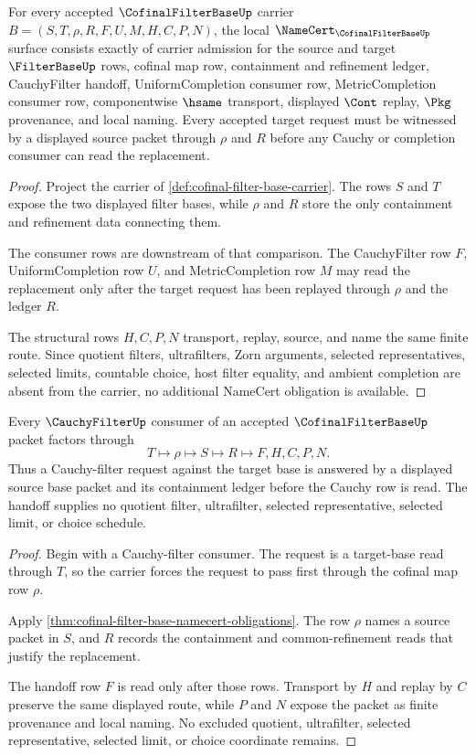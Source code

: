 \begin{theorem}
\label{thm:cofinal-filter-base-namecert-obligations}
For every accepted $\CofinalFilterBaseUp$ carrier $B=(S,T,\rho,R,F,U,M,H,C,P,N)$, the local $\NameCert_{\CofinalFilterBaseUp}$ surface consists exactly of carrier admission for the source and target $\FilterBaseUp$ rows, cofinal map row, containment and refinement ledger, CauchyFilter handoff, UniformCompletion consumer row, MetricCompletion consumer row, componentwise $\hsame$ transport, displayed $\Cont$ replay, $\Pkg$ provenance, and local naming. Every accepted target request must be witnessed by a displayed source packet through $\rho$ and $R$ before any Cauchy or completion consumer can read the replacement.
\end{theorem}
\begin{proof}
Project the carrier of \autoref{def:cofinal-filter-base-carrier}. The rows $S$ and $T$ expose the two displayed filter bases, while $\rho$ and $R$ store the only containment and refinement data connecting them.

The consumer rows are downstream of that comparison. The CauchyFilter row $F$, UniformCompletion row $U$, and MetricCompletion row $M$ may read the replacement only after the target request has been replayed through $\rho$ and the ledger $R$.

The structural rows $H,C,P,N$ transport, replay, source, and name the same finite route. Since quotient filters, ultrafilters, Zorn arguments, selected representatives, selected limits, countable choice, host filter equality, and ambient completion are absent from the carrier, no additional NameCert obligation is available.
\end{proof}

\begin{theorem}
\label{thm:cofinal-filter-base-cauchyfilter-handoff}
Every $\CauchyFilterUp$ consumer of an accepted $\CofinalFilterBaseUp$ packet factors through
$$
T \longmapsto \rho \longmapsto S \longmapsto R \longmapsto F,H,C,P,N .
$$
Thus a Cauchy-filter request against the target base is answered by a displayed source base packet and its containment ledger before the Cauchy row is read. The handoff supplies no quotient filter, ultrafilter, selected representative, selected limit, or choice schedule.
\end{theorem}
\begin{proof}
Begin with a Cauchy-filter consumer. The request is a target-base read through $T$, so the carrier forces the request to pass first through the cofinal map row $\rho$.

Apply \autoref{thm:cofinal-filter-base-namecert-obligations}. The row $\rho$ names a source packet in $S$, and $R$ records the containment and common-refinement reads that justify the replacement.

The handoff row $F$ is read only after those rows. Transport by $H$ and replay by $C$ preserve the same displayed route, while $P$ and $N$ expose the packet as finite provenance and local naming. No excluded quotient, ultrafilter, selected representative, selected limit, or choice coordinate remains.
\end{proof}

